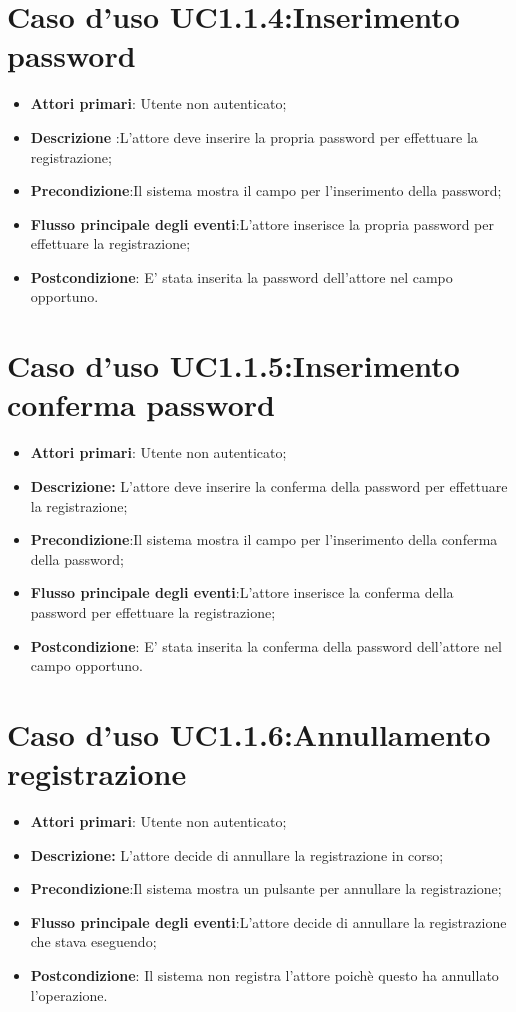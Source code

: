 		\section{Caso d'uso UC1.1.4:Inserimento  password}
		\begin{itemize}
			\item \textbf{Attori primari}: Utente non autenticato;
			\item \textbf{Descrizione} :L'attore deve inserire la propria password per effettuare la registrazione;
			\item \textbf{Precondizione}:Il sistema mostra il campo per l'inserimento della password;
			\item \textbf{Flusso principale degli eventi}:L'attore inserisce la propria password per effettuare la registrazione;
			\item \textbf{Postcondizione}: E' stata inserita la password dell'attore nel campo opportuno.
		\end{itemize}
		\section{Caso d'uso UC1.1.5:Inserimento  conferma password}
		\begin{itemize}
			\item \textbf{Attori primari}: Utente non autenticato;
			\item \textbf{Descrizione:} L'attore deve inserire la conferma della password per effettuare la registrazione;
			\item \textbf{Precondizione}:Il sistema mostra il campo per l'inserimento della conferma della password;
			\item \textbf{Flusso principale degli eventi}:L'attore inserisce la conferma della password per effettuare la registrazione;
			\item \textbf{Postcondizione}: E' stata inserita la conferma della password dell'attore nel campo opportuno.
		\end{itemize}
		\section{Caso d'uso UC1.1.6:Annullamento registrazione}
		\begin{itemize}
			\item \textbf{Attori primari}: Utente non autenticato;
			\item \textbf{Descrizione:} L'attore decide di annullare la registrazione in corso;
			\item \textbf{Precondizione}:Il sistema mostra un pulsante per annullare la  registrazione;
			\item \textbf{Flusso principale degli eventi}:L'attore decide di annullare la registrazione che stava eseguendo;
			\item \textbf{Postcondizione}: Il sistema non registra l'attore poichè questo ha annullato l'operazione.
		\end{itemize}
